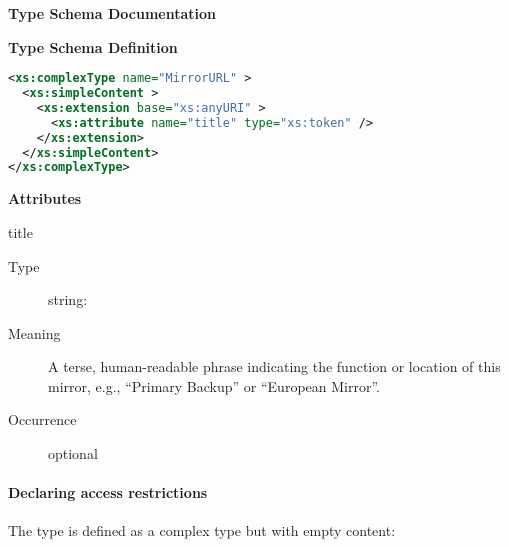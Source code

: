\documentclass[11pt,a4paper]{ivoa}
\begin{document}
\begin{generated}
\begingroup
      	\renewcommand*\descriptionlabel[1]{%
      	\hbox to 5.5em{\emph{#1}\hfil}}\vspace{2ex}\noindent\textbf{ Type Schema Documentation}


\vspace{1ex}\noindent\textbf{ Type Schema Definition}

\begin{lstlisting}[language=XML,basicstyle=\footnotesize]
<xs:complexType name="MirrorURL" >
  <xs:simpleContent >
    <xs:extension base="xs:anyURI" >
      <xs:attribute name="title" type="xs:token" />
    </xs:extension>
  </xs:simpleContent>
</xs:complexType>
\end{lstlisting}

\vspace{0.5ex}\noindent\textbf{ Attributes}

\begingroup\small\begin{bigdescription}
\item[title]
\begin{description}
\item[Type] string: 
\item[Meaning] 
                  A terse, human-readable phrase indicating the function
                  or location of this mirror, e.g., “Primary Backup” or
                  “European Mirror”.
               
\item[Occurrence] optional
\end{description}


\end{bigdescription}\endgroup

\endgroup
\end{generated}



\paragraph{Declaring access restrictions}

The  type is
defined as a complex type but with empty content:
\end{document}
